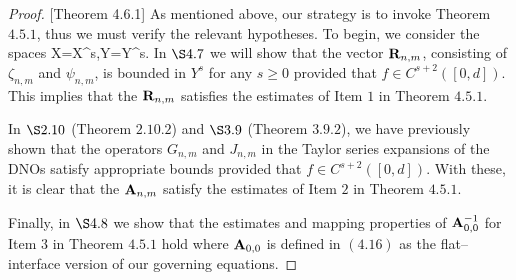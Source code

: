 \begin{proof}{[Theorem 4.6.1]} As mentioned above, our strategy is to invoke Theorem $4.5.1$, thus we must verify the relevant hypotheses. To begin, we consider the spaces 
\bes
    X=X^{s},\quad Y=Y^s.
\ees
In $\S 4.7$ we will show that the vector $\mathbf{R}_{n,m}$, consisting of $\zeta_{n,m}$ and $\psi_{n,m}$, is bounded in $Y^s$ for any $s\ge 0$ provided that $f\in C^{s+2}([0,d])$. This implies that the $\mathbf{R}_{n,m}$ satisfies the estimates of Item $1$ in Theorem $4.5.1$.

In $\S 2.10$ (Theorem $2.10.2$) and $\S 3.9$ (Theorem $3.9.2$), we have previously shown that the operators $G_{n,m}$ and $J_{n,m}$ in the Taylor series expansions of the DNOs satisfy appropriate bounds provided that $f\in C^{s+2}([0,d])$. With these, it is clear that the $\mathbf{A}_{n,m}$ satisfy the estimates of Item $2$ in Theorem $4.5.1$.

Finally, in $\S 4.8$ we show that the estimates and mapping properties of $\mathbf{A}_{0,0}^{-1}$ for Item $3$ in Theorem $4.5.1$ hold where $\mathbf{A}_{0,0}$ is defined in $(4.16)$ as the flat--interface version of our governing equations.
\end{proof}
